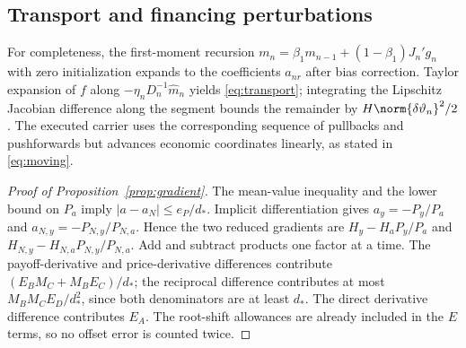 \subsection{Transport and financing perturbations}
For completeness, the first-moment recursion $m_n=\beta_1m_{n-1}+(1-\beta_1)J_n'g_n$ with zero initialization expands to the coefficients $a_{nr}$ after bias correction. Taylor expansion of $f$ along $-\eta_nD_n^{-1}\widehat m_n$ yields \eqref{eq:transport}; integrating the Lipschitz Jacobian difference along the segment bounds the remainder by $H\norm{\delta\vartheta_n}^2/2$. The executed carrier uses the corresponding sequence of pullbacks and pushforwards but advances economic coordinates linearly, as stated in \eqref{eq:moving}.

\begin{proof}[Proof of Proposition~\ref{prop:gradient}]
The mean-value inequality and the lower bound on $P_a$ imply $|a-a_N|\leq e_P/d_*$. Implicit differentiation gives $a_y=-P_y/P_a$ and $a_{N,y}=-P_{N,y}/P_{N,a}$. Hence the two reduced gradients are $H_y-H_aP_y/P_a$ and $H_{N,y}-H_{N,a}P_{N,y}/P_{N,a}$. Add and subtract products one factor at a time. The payoff-derivative and price-derivative differences contribute $(E_BM_C+M_BE_C)/d_*$; the reciprocal difference contributes at most $M_BM_CE_D/d_*^2$, since both denominators are at least $d_*$. The direct derivative difference contributes $E_A$. The root-shift allowances are already included in the $E$ terms, so no offset error is counted twice.
\end{proof}

